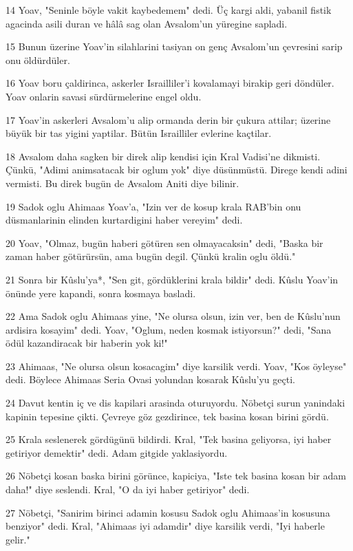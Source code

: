 \par 14 Yoav, "Seninle böyle vakit kaybedemem" dedi. Üç kargi aldi, yabanil fistik agacinda asili duran ve hâlâ sag olan Avsalom'un yüregine sapladi.
\par 15 Bunun üzerine Yoav'in silahlarini tasiyan on genç Avsalom'un çevresini sarip onu öldürdüler.
\par 16 Yoav boru çaldirinca, askerler Israilliler'i kovalamayi birakip geri döndüler. Yoav onlarin savasi sürdürmelerine engel oldu.
\par 17 Yoav'in askerleri Avsalom'u alip ormanda derin bir çukura attilar; üzerine büyük bir tas yigini yaptilar. Bütün Israilliler evlerine kaçtilar.
\par 18 Avsalom daha sagken bir direk alip kendisi için Kral Vadisi'ne dikmisti. Çünkü, "Adimi animsatacak bir oglum yok" diye düsünmüstü. Direge kendi adini vermisti. Bu direk bugün de Avsalom Aniti diye bilinir.
\par 19 Sadok oglu Ahimaas Yoav'a, "Izin ver de kosup krala RAB'bin onu düsmanlarinin elinden kurtardigini haber vereyim" dedi.
\par 20 Yoav, "Olmaz, bugün haberi götüren sen olmayacaksin" dedi, "Baska bir zaman haber götürürsün, ama bugün degil. Çünkü kralin oglu öldü."
\par 21 Sonra bir Kûslu'ya*, "Sen git, gördüklerini krala bildir" dedi. Kûslu Yoav'in önünde yere kapandi, sonra kosmaya basladi.
\par 22 Ama Sadok oglu Ahimaas yine, "Ne olursa olsun, izin ver, ben de Kûslu'nun ardisira kosayim" dedi. Yoav, "Oglum, neden kosmak istiyorsun?" dedi, "Sana ödül kazandiracak bir haberin yok ki!"
\par 23 Ahimaas, "Ne olursa olsun kosacagim" diye karsilik verdi. Yoav, "Kos öyleyse" dedi. Böylece Ahimaas Seria Ovasi yolundan kosarak Kûslu'yu geçti.
\par 24 Davut kentin iç ve dis kapilari arasinda oturuyordu. Nöbetçi surun yanindaki kapinin tepesine çikti. Çevreye göz gezdirince, tek basina kosan birini gördü.
\par 25 Krala seslenerek gördügünü bildirdi. Kral, "Tek basina geliyorsa, iyi haber getiriyor demektir" dedi. Adam gitgide yaklasiyordu.
\par 26 Nöbetçi kosan baska birini görünce, kapiciya, "Iste tek basina kosan bir adam daha!" diye seslendi. Kral, "O da iyi haber getiriyor" dedi.
\par 27 Nöbetçi, "Sanirim birinci adamin kosusu Sadok oglu Ahimaas'in kosusuna benziyor" dedi. Kral, "Ahimaas iyi adamdir" diye karsilik verdi, "Iyi haberle gelir."
